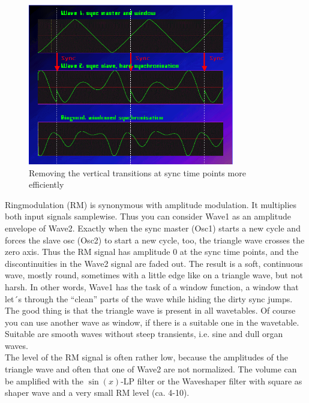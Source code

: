 \begin{figure}[ht!]
	\centering
	\includegraphics[width=90mm]{pics/format_shift_window_sync.png}
	\caption{Removing the vertical transitions at sync time points more efficiently}
	\label{Formatshift_window_sync}
\end{figure}
Ringmodulation (RM) is synonymous  with amplitude modulation. It multiplies both input signals samplewise. Thus you can consider Wave1 as an amplitude envelope of Wave2. Exactly when the sync master (Osc1) starts a new cycle and forces the slave osc (Osc2) to start a new cycle, too, the triangle wave crosses the zero axis. Thus the RM signal has amplitude 0 at the sync time points, and the discontinuities in the Wave2 signal are faded out. The result is a soft, continuous wave, mostly round, sometimes with a little edge like on a triangle wave, but not harsh. In other words, Wave1 has the task of a window function, a window that let´s through the “clean” parts of the wave while hiding the dirty sync jumps.\\
The good thing is that the triangle wave is present in all wavetables. Of course you can use another wave as window, if there is a suitable one in the wavetable. Suitable are smooth waves without steep transients, i.e. sine and dull organ waves.\\
The level of the RM signal is often rather low, because the amplitudes of the triangle wave and often that one of Wave2 are not normalized. The volume can be amplified with the $\sin(x)$-LP filter or the Waveshaper filter with square as shaper wave and a very small RM level (ca. 4-10).
